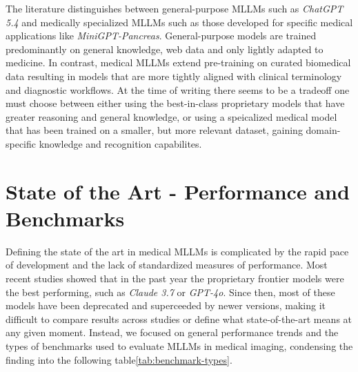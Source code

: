 \documentclass{imc-inf}
\begin{document}
The literature distinguishes between general-purpose MLLMs such as \textit{ChatGPT 5.4} and medically specialized MLLMs such as those developed for specific medical applications like \textit{MiniGPT-Pancreas}.\cite{moglia2026minigpt}
General-purpose models are trained predominantly on general knowledge, web data and only lightly adapted to medicine.
In contrast, medical MLLMs extend pre-training on curated biomedical data resulting in models that are more tightly aligned with clinical terminology and diagnostic workflows.
At the time of writing there seems to be a tradeoff one must choose between either using the best-in-class proprietary models that have greater reasoning and general knowledge, or using a speicalized medical model that has been trained on a smaller, but more relevant dataset, gaining domain-specific knowledge and recognition capabilites.

\section{State of the Art - Performance and Benchmarks}

Defining the state of the art in medical MLLMs is complicated by the rapid pace of development and the lack of standardized measures of performance.
Most recent studies showed that in the past year the proprietary frontier models were the best performing, such as \textit{Claude 3.7} or \textit{GPT-4o}.
Since then, most of these models have been deprecated and superceeded by newer versions, making it difficult to compare results across studies or define what state-of-the-art means at any given moment.
Instead, we focused on general performance trends and the types of benchmarks used to evaluate MLLMs in medical imaging, condensing the finding into the following table\ref{tab:benchmark-types}.
\end{document}
